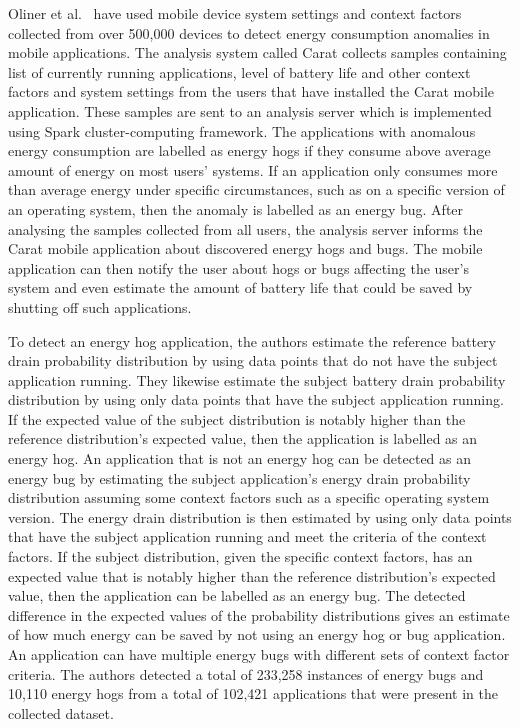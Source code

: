 Oliner et al.~\cite{Oliner:2012:CED:2387858.2387864, Oliner:2013:CCE:2517351.2517354} have used mobile device system settings and context factors collected from over 500,000 devices to detect energy consumption anomalies in mobile applications. The analysis system called Carat collects samples containing list of currently running applications, level of battery life and other context factors and system settings from the users that have installed the Carat mobile application. These samples are sent to an analysis server which is implemented using Spark cluster-computing framework. The applications with anomalous energy consumption are labelled as energy hogs if they consume above average amount of energy on most users' systems. If an application only consumes more than average energy under specific circumstances, such as on a specific version of an operating system, then the anomaly is labelled as an energy bug. After analysing the samples collected from all users, the analysis server informs the Carat mobile application about discovered energy hogs and bugs. The mobile application can then notify the user about hogs or bugs affecting the user's system and even estimate the amount of battery life that could be saved by shutting off such applications.  

To detect an energy hog application, the authors estimate the reference battery drain probability distribution by using data points that do not have the subject application running. They likewise estimate the subject battery drain probability distribution by using only data points that have the subject application running. If the expected value of the subject distribution is notably higher than the reference distribution's expected value, then the application is labelled as an energy hog. An application that is not an energy hog can be detected as an energy bug by estimating the subject application's energy drain probability distribution assuming some context factors such as a specific operating system version. The energy drain distribution is then estimated by using only data points that have the subject application running and meet the criteria of the context factors. If the subject distribution, given the specific context factors, has an expected value that is notably higher than the reference distribution's expected value, then the application can be labelled as an energy bug. The detected difference in the expected values of the probability distributions gives an estimate of how much energy can be saved by not using an energy hog or bug application. An application can have multiple energy bugs with different sets of context factor criteria. The authors detected a total of 233,258 instances of energy bugs and 10,110 energy hogs from a total of 102,421 applications that were present in the collected dataset.              

